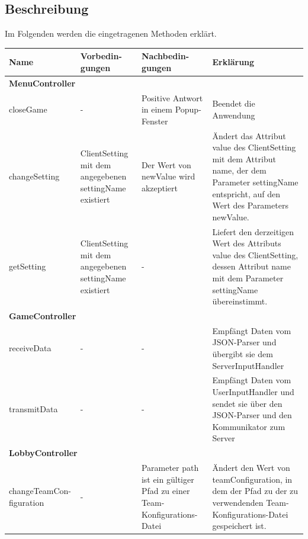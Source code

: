 \subsection{Beschreibung}
	Im Folgenden werden die eingetragenen Methoden erklärt.
\begin{center}
	\begin{tabular}{|p{4.0cm}|p{2.2cm}|p{2.2cm}|p{4.7cm}|}
		\hline
		\textbf{Name} & \textbf{Vorbedin-gungen} & \textbf{Nachbedin-gungen} & \textbf{Erklärung}\\\hline
		\multicolumn{4}{|l|}{\textbf{MenuController}} \\\hline
		closeGame & - & Positive Antwort in einem Popup-Fenster & Beendet die Anwendung\\\hline
		changeSetting & ClientSetting mit dem angegebenen settingName existiert & Der Wert von newValue wird akzeptiert & Ändert das Attribut value des ClientSetting mit dem Attribut name, der dem Parameter settingName entspricht, auf den Wert des Parameters newValue.\\\hline
		getSetting& ClientSetting mit dem angegebenen settingName existiert & - & Liefert den derzeitigen Wert des Attributs value des ClientSetting, dessen Attribut name mit dem Parameter settingName übereinstimmt.\\\hline
		\multicolumn{4}{|l|}{\textbf{GameController}} \\\hline
		receiveData & - & - & Empfängt Daten vom JSON-Parser und übergibt sie dem ServerInputHandler\\\hline
		transmitData & - & - & Empfängt Daten vom UserInputHandler und sendet sie über den JSON-Parser und den Kommunikator zum Server\\\hline
		\multicolumn{4}{|l|}{\textbf{LobbyController}} \\\hline
		changeTeamCon-figuration & - & Parameter path ist ein gültiger Pfad zu einer Team-Konfigurations-Datei & Ändert den Wert von teamConfiguration, in dem der Pfad zu der zu verwendenden Team-Konfigurations-Datei gespeichert ist.\\\hline
		
	\end{tabular}
	

\end{center}
